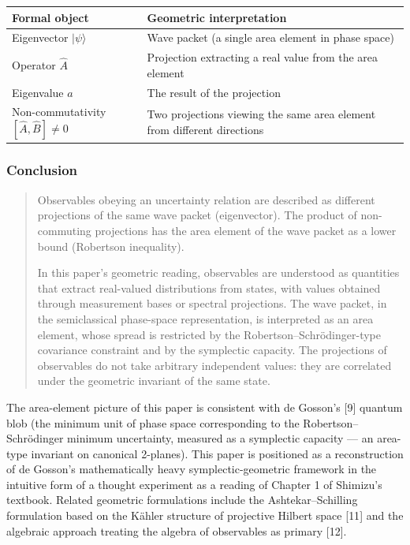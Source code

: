 \documentclass[
]{article}
\newcounter{none} %
\begin{document}
{\def\LTcaptype{none} %
\begin{longtable}[]{@{}
  >{\raggedright\arraybackslash}p{}
  >{\raggedright\arraybackslash}p{}@{}}
\toprule\noalign{}
\begin{minipage}[b]{\linewidth}\raggedright
Formal object
\end{minipage} & \begin{minipage}[b]{\linewidth}\raggedright
Geometric interpretation
\end{minipage} \\
\midrule\noalign{}
\endhead
\bottomrule\noalign{}
\endlastfoot
Eigenvector \(|\psi\rangle\) & Wave packet (a single area element in
phase space) \\
Operator \(\hat{A}\) & Projection extracting a real value from the area
element \\
Eigenvalue \(a\) & The result of the projection \\
Non-commutativity \([\hat{A}, \hat{B}] \neq 0\) & Two projections
viewing the same area element from different directions \\
\end{longtable}
}

\subsubsection{Conclusion}\label{conclusion-4}

\begin{quote}
Observables obeying an uncertainty relation are described as different
projections of the same wave packet (eigenvector). The product of
non-commuting projections has the area element of the wave packet as a
lower bound (Robertson inequality).

In this paper's geometric reading, observables are understood as
quantities that extract real-valued distributions from states, with
values obtained through measurement bases or spectral projections. The
wave packet, in the semiclassical phase-space representation, is
interpreted as an area element, whose spread is restricted by the
Robertson--Schrödinger-type covariance constraint and by the symplectic
capacity. The projections of observables do not take arbitrary
independent values: they are correlated under the geometric invariant of
the same state.
\end{quote}

The area-element picture of this paper is consistent with de Gosson's
{[}9{]} quantum blob (the minimum unit of phase space corresponding to
the Robertson--Schrödinger minimum uncertainty, measured as a symplectic
capacity --- an area-type invariant on canonical 2-planes). This paper
is positioned as a reconstruction of de Gosson's mathematically heavy
symplectic-geometric framework in the intuitive form of a thought
experiment as a reading of Chapter 1 of Shimizu's textbook. Related
geometric formulations include the Ashtekar--Schilling formulation based
on the Kähler structure of projective Hilbert space {[}11{]} and the
algebraic approach treating the algebra of observables as primary
{[}12{]}.
\end{document}
